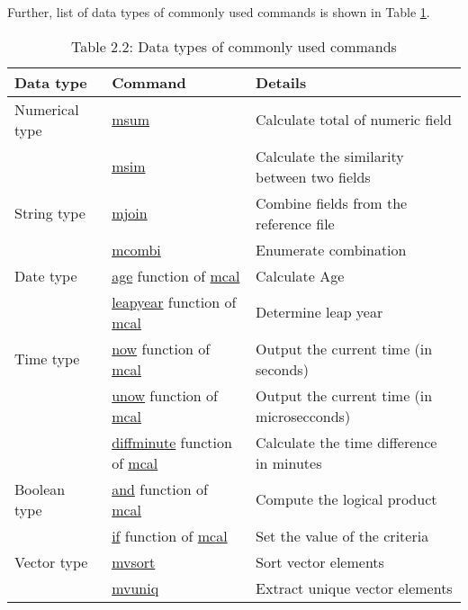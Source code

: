 Further, list of data types of commonly used commands is shown in Table \ref{tbl:datatype_commands}.

\begin{table}[!hb]
\begin{center}
\caption{Table 2.2: Data types of commonly used commands\label{tbl:datatype_commands}}
{\small
  \begin{tabular}{l|l|l} \hline
Data type      & Command                                                                        & Details \\ \hline
Numerical type & \hyperref[sect:msum]{msum}                                                     & Calculate total of numeric field \\
               & \hyperref[sect:msim]{msim}                                                     & Calculate the similarity between two fields \\
\hline
String type    & \hyperref[sect:mjoin]{mjoin}                                                   & Combine fields from the reference file \\
               & \hyperref[sect:mcombi]{mcombi}                                                 & Enumerate combination \\
\hline
Date type      & \hyperref[sect:age]{age} function of \hyperref[sect:mcal]{mcal}                & Calculate Age \\
               & \hyperref[sect:leapyear]{leapyear} function of \hyperref[sect:mcal]{mcal}      & Determine leap year \\
\hline
Time type      & \hyperref[sect:now]{now} function of \hyperref[sect:mcal]{mcal}                & Output the current time (in seconds) \\
               & \hyperref[sect:unow]{unow} function of \hyperref[sect:mcal]{mcal}              & Output the current time (in microsecconds) \\
               & \hyperref[sect:diff]{diffminute} function of \hyperref[sect:mcal]{mcal}        & Calculate the time difference in minutes \\
\hline
Boolean type   & \hyperref[sect:and]{and} function of \hyperref[sect:mcal]{mcal}                & Compute the logical product \\
               & \hyperref[sect:if]{if} function of \hyperref[sect:mcal]{mcal}                  & Set the value of the criteria \\
\hline
Vector type    & \hyperref[sect:mvsort]{mvsort}                                                 & Sort vector elements \\
               & \hyperref[sect:mvuniq]{mvuniq}                                                 & Extract unique vector elements \\
\hline
  \end{tabular}
  }
  \end{center}
\end{table}

